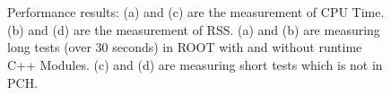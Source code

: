 \documentclass{webofc}
\begin{document}
\begin{figure}
\begin{minipage}{.48\textwidth}
 　 \end{minipage}\hfill
    \begin{minipage}{.48\textwidth}
 　 \end{minipage}
\caption{Performance results: (a) and (c) are the measurement of CPU Time. (b) and (d) are the measurement of RSS. (a) and (b) are measuring long tests (over 30 seconds) in ROOT with and without runtime C++ Modules. (c) and (d) are measuring short tests which is not in PCH.}
\label{fig:performance1}
\end{figure}
\end{document}
